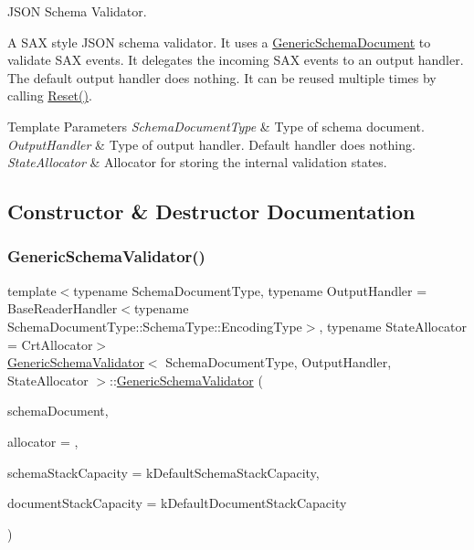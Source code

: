 J\+S\+ON Schema Validator. 

A S\+AX style J\+S\+ON schema validator. It uses a {\ttfamily \hyperlink{classGenericSchemaDocument}{Generic\+Schema\+Document}} to validate S\+AX events. It delegates the incoming S\+AX events to an output handler. The default output handler does nothing. It can be reused multiple times by calling {\ttfamily \hyperlink{classGenericSchemaValidator_a49efbbe098cb77728be3d48cafed17e4}{Reset()}}.


\begin{DoxyTemplParams}{Template Parameters}
{\em Schema\+Document\+Type} & Type of schema document. \\
\hline
{\em Output\+Handler} & Type of output handler. Default handler does nothing. \\
\hline
{\em State\+Allocator} & Allocator for storing the internal validation states. \\
\hline
\end{DoxyTemplParams}


\subsection{Constructor \& Destructor Documentation}
\mbox{\label{classGenericSchemaValidator_a202ee6fdbe5ae9eab3e77a81ecdfeb6d}} 
\subsubsection{\texorpdfstring{Generic\+Schema\+Validator()}{GenericSchemaValidator()}\hspace{0.1cm}{\footnotesize\ttfamily [1/2]}}
{\footnotesize\ttfamily template$<$typename Schema\+Document\+Type, typename Output\+Handler = Base\+Reader\+Handler$<$typename Schema\+Document\+Type\+::\+Schema\+Type\+::\+Encoding\+Type$>$, typename State\+Allocator = Crt\+Allocator$>$ \\
\hyperlink{classGenericSchemaValidator}{Generic\+Schema\+Validator}$<$ Schema\+Document\+Type, Output\+Handler, State\+Allocator $>$\+::\hyperlink{classGenericSchemaValidator}{Generic\+Schema\+Validator} (\begin{DoxyParamCaption}\item[{const Schema\+Document\+Type \&}]{schema\+Document,  }\item[{State\+Allocator $\ast$}]{allocator = {},  }\item[{size\+\_\+t}]{schema\+Stack\+Capacity = {\ttfamily kDefaultSchemaStackCapacity},  }\item[{size\+\_\+t}]{document\+Stack\+Capacity = {\ttfamily kDefaultDocumentStackCapacity} }\end{DoxyParamCaption})\hspace{0.3cm}{\ttfamily [inline]}}



